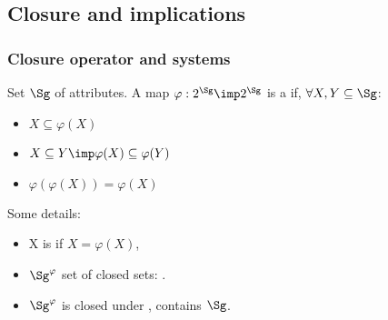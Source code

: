 

\subsection{Closure and implications}

\begin{frame}
\frametitle{Closure operator and systems}

Set $\Sg$ of attributes. A map $\varphi: 2^{\Sg} \imp 2^{\Sg}$ is a 
 if, $\forall X, Y \subseteq \Sg$:
\begin{itemize}
	\item $X \subseteq \varphi(X)$ \quad {}
	\item $X \subseteq Y \imp \varphi(X) \subseteq \varphi(Y)$ 
	\quad {}
	\item $\varphi(\varphi(X)) = \varphi(X)$ \quad {}
\end{itemize}

\vspace{1.2em}

Some details:
\begin{itemize}
	\item X is  if $X = \varphi(X)$,
	\item $\Sg^\varphi$ set of closed sets: .
	\item $\Sg^\varphi$ is closed under , contains $\Sg$.
\end{itemize}

\end{frame}

